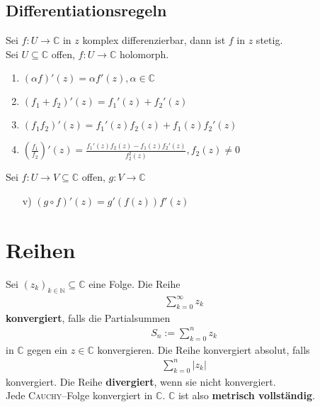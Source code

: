 \documentclass[a4paper,12pt]{article}
\numberwithin{equation}{section}
\begin{document}
\subsection{Differentiationsregeln}
Sei $f:U\rightarrow \mathbb{C}$ in $z$ komplex differenzierbar, dann ist $f$ in $z$ stetig.\\\indent
Sei $U\subseteq \mathbb{C}$ offen, $f:U\rightarrow \mathbb{C}$ holomorph.
\begin{enumerate}[label=\roman*)]
        \item $\left(\alpha f\right)'\left(z\right)=\alpha f'\left(z\right),\alpha  \in \mathbb{C}$ 
        \item $\left(f_1+f_2\right)'\left(z\right)=f_1'\left(z\right)+f_2'\left(z\right)$ 
        \item $\left(f_1f_2\right)'\left(z\right)=f_1'\left(z\right)f_2\left(z\right)+f_1\left(z\right)f_2'\left(z\right)$ 
        \item $\left(\tfrac{f_1}{f_2}\right)'\left(z\right)=\tfrac{f_1'\left(z\right)f_2\left(z\right)-f_1\left(z\right)f_2'\left(z\right)}{f_2^2\left(z\right)},f_2\left(z\right)\neq 0$ 
\end{enumerate}
Sei $f:U\rightarrow V\subseteq \mathbb{C}$ offen, $g:V\rightarrow \mathbb{C}$ 
\begin{enumerate}[label=]
        \item[v)] $\left(g\circ f\right)'\left(z\right)=g'\left(f\left(z\right)\right)f'\left(z\right)$ 
\end{enumerate}

\newpage
\section{Reihen}
Sei $\left(z_k\right)_{k \in \mathbb{N}}\subseteq \mathbb{C}$ eine Folge. Die Reihe 
\begin{align} 
        \sum_{k=0}^{\infty}z_k
\end{align} 
\textbf{konvergiert}, falls die Partialsummen
\begin{align} 
        S_n:=\sum_{k=0}^{n}z_k
\end{align} 
in $\mathbb{C}$ gegen ein $z \in \mathbb{C}$ konvergieren. Die Reihe konvergiert absolut, falls
\begin{align} 
        \sum_{k=0}^{n}|z_k|
\end{align} 
konvergiert. Die Reihe \textbf{divergiert}, wenn sie nicht konvergiert.\\\indent
Jede \textsc{Cauchy}--Folge konvergiert in $\mathbb{C}$. $\mathbb{C}$ ist also \textbf{metrisch vollständig}.

\end{document}
